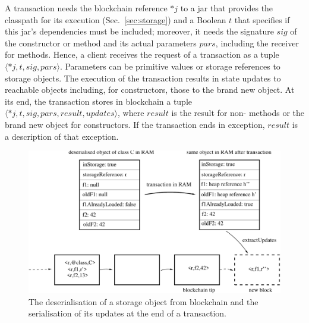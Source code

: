 \documentclass[10pt]{llncs}
\def\codesize{}
\def\<#1>{\codeid{#1}}
\newcommand{\codeid}[1]{\ifmmode{\mbox{\codesize\ttfamily{#1}}}\else{\codesize\ttfamily #1}\fi}
\begin{document}
A transaction needs the blockchain reference $*j$ to a jar that
provides the classpath for its execution
(Sec.~\ref{sec:storage}) and a Boolean $t$ that specifies
if this jar's dependencies must be included; moreover,
it needs the signature $\mathit{sig}$ of the constructor or method
and its actual parameters $\mathit{pars}$, including the receiver for methods.
Hence, a client receives the request of a transaction as a tuple
$\langle *j,t,\mathit{sig},\mathit{pars}\rangle$.
Parameters can be primitive values
or storage references to storage objects.
The execution of the transaction results
in state updates to reachable objects
including, for constructors, those to the brand new object.
At its end, the transaction stores in blockchain a tuple
$\langle *j,t,\mathit{sig},\mathit{pars},\mathit{result},\mathit{updates}\rangle$,
where $\mathit{result}$ is the result for non-\<void> methods or the brand new object
for constructors. If the transaction ends in exception,
$\mathit{result}$ is a description of that exception.

\begin{figure}[t]
  \includegraphics[width=\textwidth]{updates.pdf}
  \caption{The deserialisation of a storage object from blockchain and the serialisation
    of its updates at the end of a transaction.}
  \label{fig:transaction}
\end{figure}
\end{document}
